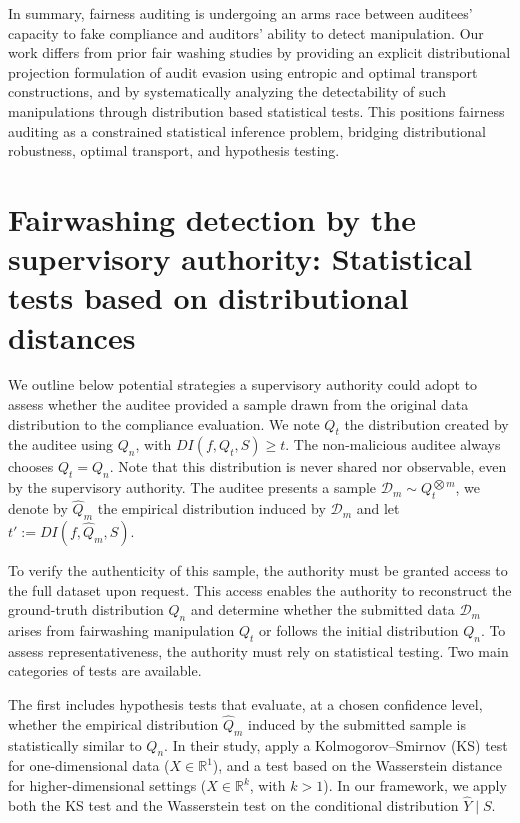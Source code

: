 \documentclass[runningheads, orivec]{llncs}
\begin{document}
In summary, fairness auditing is undergoing an arms race between auditees’ capacity to fake compliance and auditors’ ability to detect manipulation. Our work differs from prior fair washing studies by providing an explicit distributional projection formulation of audit evasion using entropic and optimal transport constructions, and by systematically analyzing the detectability of such manipulations through distribution based statistical tests. This positions fairness auditing as a constrained statistical inference problem, bridging distributional robustness, optimal transport, and hypothesis testing.

\section{Fairwashing detection by the supervisory authority: Statistical tests based on distributional distances} \label{sec:stat_tests}

We outline below potential strategies a supervisory authority could adopt to assess whether the auditee provided a sample drawn from the original data distribution to the compliance evaluation. We note $Q_{t}$ the distribution created by the auditee using $Q_n$, with $DI(f, Q_{t}, S) \geq t$. The non-malicious auditee always chooses $Q_{t} = Q_n$. Note that this distribution is never shared nor observable, even by the supervisory authority. The auditee presents a sample $\mathcal{D}_m \sim Q_t^{\bigotimes m}$, we denote by $\widehat{Q}_m$ the empirical distribution induced by $\mathcal{D}_m$ and let $t':= DI(f, \widehat{Q}_m,S)$. 

To verify the authenticity of this sample, the authority must be granted access to the full dataset upon request. This access enables the authority to reconstruct the ground-truth distribution $Q_n$ and determine whether the submitted data $\mathcal{D}_m$ arises from fairwashing manipulation $Q_t$ or follows the initial distribution $Q_n$. To assess representativeness, the authority must rely on statistical testing. Two main categories of tests are available. 



The first includes hypothesis tests that evaluate, at a chosen confidence level, whether the empirical distribution $\widehat{Q}_{m}$ induced by the submitted sample is statistically similar to $Q_n$. In their study, \cite{fukuchi2020faking} apply a Kolmogorov–Smirnov (KS) test for one-dimensional data ($X \in \mathbb{R}^1$), and a test based on the Wasserstein distance for higher-dimensional settings ($X \in \mathbb{R}^k$, with $k > 1$). In our framework, we apply both the KS test and the Wasserstein test on the conditional distribution $\widehat{Y} \mid S$. 
\end{document}
